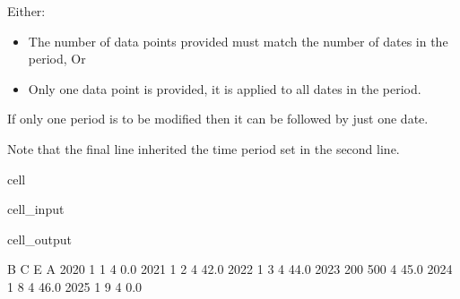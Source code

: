 \documentclass[letterpaper,10pt,english]{jupyterBook}
\begin{document}
\sphinxAtStartPar
Either:
\begin{itemize}
\item {} 
\sphinxAtStartPar
The number of data points provided must match the number of dates in the period, Or

\item {} 
\sphinxAtStartPar
Only one data point is provided, it is applied to all dates in the period.

\end{itemize}

\sphinxAtStartPar
If only one period is to be modified then it can be followed by just one date.

\sphinxAtStartPar
Note that the final line inherited the time period set in the second line.

\begin{sphinxuseclass}{cell}\begin{sphinxVerbatimInput}

\begin{sphinxuseclass}{cell_input}
\begin{sphinxVerbatim}[commandchars=\\\{\}]
\end{sphinxVerbatim}

\end{sphinxuseclass}\end{sphinxVerbatimInput}
\begin{sphinxVerbatimOutput}

\begin{sphinxuseclass}{cell_output}
\begin{sphinxVerbatim}[commandchars=\\\{\}]
        B    C  E     A
2020    1    1  4   0.0
2021    1    2  4  42.0
2022    1    3  4  44.0
2023  200  500  4  45.0
2024    1    8  4  46.0
2025    1    9  4   0.0
\end{sphinxVerbatim}

\end{sphinxuseclass}\end{sphinxVerbatimOutput}

\end{sphinxuseclass}
\end{document}
